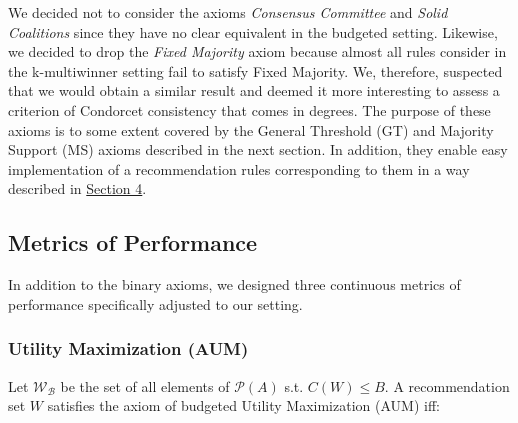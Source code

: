 \documentclass{article}
\begin{document}
We decided not to consider the axioms \emph{Consensus Committee} and \emph{Solid Coalitions} since they have no clear equivalent in the budgeted setting. Likewise, we decided to drop the \emph{Fixed Majority} axiom because almost all rules  consider in the k-multiwinner setting fail to satisfy Fixed Majority. We, therefore, suspected that we would obtain a similar result and deemed it more interesting to assess a criterion of Condorcet consistency that comes in degrees.
The purpose of these axioms is to some extent covered by the General Threshold (GT) and Majority Support (MS) axioms described in the next section. In addition, they enable easy implementation of a  recommendation rules corresponding to them in a way described in \hyperlink{rules}{Section  4}. %



\subsection{Metrics of Performance}

In addition to the binary axioms, we designed three continuous metrics of performance specifically adjusted to our setting.

\subsubsection{Utility Maximization (AUM)}

Let $\mathcal {W_B}$ be the set of all elements of $\mathcal{P}(A)$ s.t. $C(W)\leq B$. A recommendation set $W$ satisfies the axiom of budgeted Utility Maximization (AUM) iff:
\end{document}
